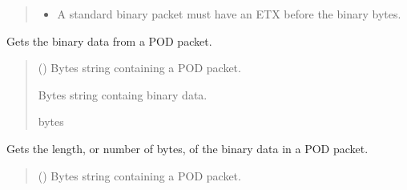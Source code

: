 \documentclass[letterpaper,10pt,english]{sphinxmanual}
\begin{document}
\begin{fulllineitems}
\begin{fulllineitems}
\begin{quote}
\begin{description}
\begin{itemize}
\item {} 
\sphinxAtStartPar
{} \textendash{} A standard binary packet must have an ETX before the binary bytes.

\end{itemize}

\end{description}\end{quote}

\end{fulllineitems}


\begin{fulllineitems}
\label{\detokenize{Morelia.Packets:Morelia.Packets.Binary.PacketBinary.GetBinaryData}}
\pysigstartsignatures
{}
\pysigstopsignatures
\sphinxAtStartPar
Gets the binary data from a POD packet.
\begin{quote}\begin{description}
\sphinxAtStartPar
{} () \textendash{} Bytes string containing a POD packet.

\sphinxAtStartPar
Bytes string containg binary data.

\sphinxAtStartPar
bytes

\end{description}\end{quote}

\end{fulllineitems}


\begin{fulllineitems}
\label{\detokenize{Morelia.Packets:Morelia.Packets.Binary.PacketBinary.GetBinaryLength}}
\pysigstartsignatures
{}
\pysigstopsignatures
\sphinxAtStartPar
Gets the length, or number of bytes, of the binary data in a POD packet.
\begin{quote}\begin{description}
\sphinxAtStartPar
{} () \textendash{} Bytes string containing a POD packet.


\end{description}
\end{quote}
\end{fulllineitems}
\end{fulllineitems}
\end{document}
